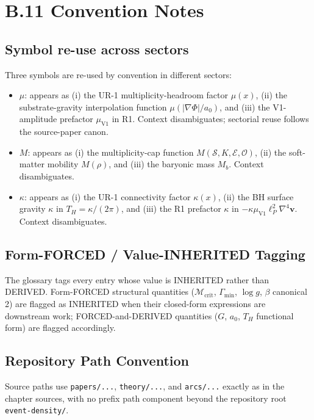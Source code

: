 \documentclass[11pt]{book}
\begin{document}
\section{B.11 Convention Notes}

\subsection{Symbol re-use across sectors}

Three symbols are re-used by convention in different sectors:

\begin{itemize}
\item \textbf{$\mu$}: appears as (i) the UR-1 multiplicity-headroom factor $\mu(x)$, (ii) the substrate-gravity interpolation function $\mu(|\nabla\Phi|/a_0)$, and (iii) the V1-amplitude prefactor $\mu_\mathrm{V1}$ in R1. Context disambiguates; sectorial reuse follows the source-paper canon.
\item \textbf{$M$}: appears as (i) the multiplicity-cap function $M(\mathcal{S}, K, \mathcal{E}, \mathcal{O})$, (ii) the soft-matter mobility $M(\rho)$, and (iii) the baryonic mass $M_b$. Context disambiguates.
\item \textbf{$\kappa$}: appears as (i) the UR-1 connectivity factor $\kappa(x)$, (ii) the BH surface gravity $\kappa$ in $T_H = \kappa/(2\pi)$, and (iii) the R1 prefactor $\kappa$ in $-\kappa\mu_\mathrm{V1}\ell_P^2\nabla^4\mathbf{v}$. Context disambiguates.
\end{itemize}

\subsection{Form-FORCED / Value-INHERITED Tagging}

The glossary tags every entry whose value is INHERITED rather than DERIVED. Form-FORCED structural quantities ($\mathcal{M}_\mathrm{crit}$, $\Gamma_\mathrm{min}$, $\log g$, $\beta$ canonical 2) are flagged as INHERITED when their closed-form expressions are downstream work; FORCED-and-DERIVED quantities ($G$, $a_0$, $T_H$ functional form) are flagged accordingly.

\subsection{Repository Path Convention}

Source paths use \texttt{papers/...}, \texttt{theory/...}, and \texttt{arcs/...} exactly as in the chapter sources, with no prefix path component beyond the repository root \texttt{event-density/}.
\end{document}
